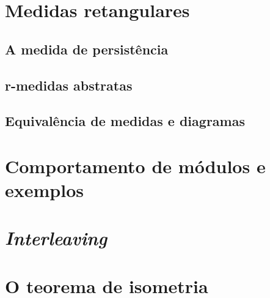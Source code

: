\section{Medidas retangulares}

\subsection{A medida de persistência}

\subsection{r-medidas abstratas}

\subsection{Equivalência de medidas e diagramas}

\section{Comportamento de módulos e exemplos}

\section{\textit{Interleaving}} 

\section{O teorema de isometria}
